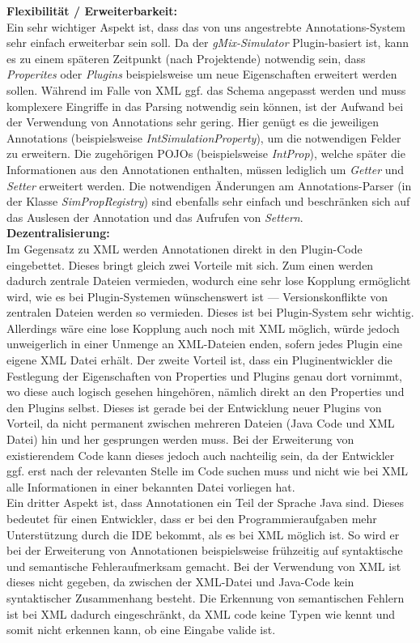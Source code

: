 \documentclass[a4paper, 11pt]{article} %
\begin{document}
\textbf{Flexibilität / Erweiterbarkeit:}\\
Ein sehr wichtiger Aspekt ist, dass das von uns angestrebte Annotations-System sehr einfach erweiterbar sein soll. Da der \emph{gMix-Simulator} Plugin-basiert ist, kann es zu einem späteren Zeitpunkt (nach Projektende) notwendig sein, dass \emph{Properites} oder \emph{Plugins} beispielsweise um neue Eigenschaften erweitert werden sollen. Während im Falle von XML ggf. das Schema angepasst werden und muss komplexere Eingriffe in das Parsing notwendig sein können, ist der Aufwand bei der Verwendung von Annotations sehr gering. Hier genügt es die jeweiligen Annotations (beispielsweise \emph{IntSimulationProperty}), um die notwendigen Felder zu erweitern. Die zugehörigen POJOs (beispielsweise \emph{IntProp}), welche später die Informationen aus den Annotationen enthalten, müssen lediglich um \emph{Getter} und \emph{Setter} erweitert werden. Die notwendigen Änderungen am Annotations-Parser (in der Klasse \emph{SimPropRegistry}) sind ebenfalls sehr einfach und beschränken sich auf das Auslesen der Annotation und das Aufrufen von \emph{Settern}.\\

\textbf{Dezentralisierung:}\\
Im Gegensatz zu XML werden Annotationen direkt in den Plugin-Code eingebettet. Dieses bringt gleich zwei Vorteile mit sich. Zum einen werden dadurch zentrale Dateien vermieden, wodurch eine sehr lose Kopplung ermöglicht wird, wie es bei Plugin-Systemen wünschenswert ist --- Versionskonflikte von zentralen Dateien werden so vermieden. Dieses ist bei Plugin-System sehr wichtig. Allerdings wäre eine lose Kopplung auch noch mit XML möglich, würde jedoch unweigerlich in einer Unmenge an XML-Dateien enden, sofern jedes Plugin eine eigene XML Datei erhält. Der zweite Vorteil ist, dass ein Pluginentwickler die Festlegung der Eigenschaften von Properties und Plugins genau dort vornimmt, wo diese auch logisch gesehen hingehören, nämlich direkt an den Properties und den Plugins selbst. Dieses ist gerade bei der Entwicklung neuer Plugins von Vorteil, da nicht permanent zwischen mehreren Dateien (Java Code und XML Datei) hin und her gesprungen werden muss. Bei der Erweiterung von existierendem Code kann dieses jedoch auch nachteilig sein, da der Entwickler ggf. erst nach der relevanten Stelle im Code suchen muss und nicht wie bei XML alle Informationen in einer bekannten Datei vorliegen hat.\\

Ein dritter Aspekt ist, dass Annotationen ein Teil der Sprache Java sind. Dieses bedeutet für einen Entwickler, dass er bei den Programmieraufgaben mehr Unterstützung durch die IDE bekommt, als es bei XML möglich ist. So wird er bei der Erweiterung von Annotationen beispielsweise frühzeitig auf syntaktische und semantische Fehleraufmerksam gemacht. Bei der Verwendung von XML ist dieses nicht gegeben, da zwischen der XML-Datei und Java-Code kein syntaktischer Zusammenhang besteht. Die Erkennung von semantischen Fehlern ist bei XML dadurch eingeschränkt, da XML code keine Typen wie kennt und somit nicht erkennen kann, ob eine Eingabe valide ist.\\
\end{document}

